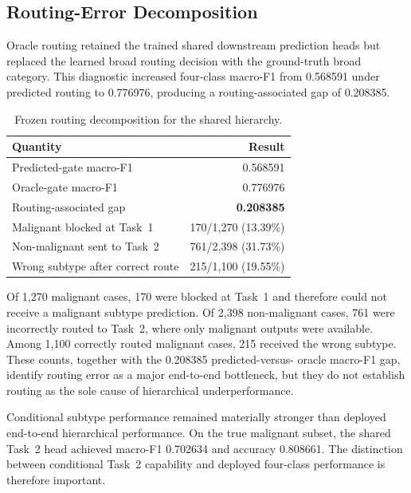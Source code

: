 \subsection{Routing-Error Decomposition}

Oracle routing retained the trained shared downstream prediction heads but
replaced the learned broad routing decision with the ground-truth broad
category. This diagnostic increased four-class macro-F1 from 0.568591 under
predicted routing to 0.776976, producing a routing-associated gap of 0.208385.

\begin{table}[t]
    \centering
    \caption{Frozen routing decomposition for the shared hierarchy.}
    \label{tab:routing_results}
    \footnotesize
    \setlength{\tabcolsep}{3.2pt}
    \begin{tabular}{lr}
        \toprule
        Quantity & Result \\
        \midrule
        Predicted-gate macro-F1 & 0.568591 \\
        Oracle-gate macro-F1 & 0.776976 \\
        Routing-associated gap & \textbf{0.208385} \\
        \midrule
        Malignant blocked at Task~1 & 170/1,270 (13.39\%) \\
        Non-malignant sent to Task~2 & 761/2,398 (31.73\%) \\
        Wrong subtype after correct route & 215/1,100 (19.55\%) \\
        \bottomrule
    \end{tabular}
\end{table}

Of 1,270 malignant cases, 170 were blocked at Task~1 and therefore could not
receive a malignant subtype prediction. Of 2,398 non-malignant cases, 761
were incorrectly routed to Task~2, where only malignant outputs were
available. Among 1,100 correctly routed malignant cases, 215 received the
wrong subtype. These counts, together with the 0.208385 predicted-versus-
oracle macro-F1 gap, identify routing error as a major end-to-end bottleneck,
but they do not establish routing as the sole cause of hierarchical
underperformance.

Conditional subtype performance remained materially stronger than deployed
end-to-end hierarchical performance. On the true malignant subset, the shared
Task~2 head achieved macro-F1 0.702634 and accuracy 0.808661. The distinction
between conditional Task~2 capability and deployed four-class performance is
therefore important.

